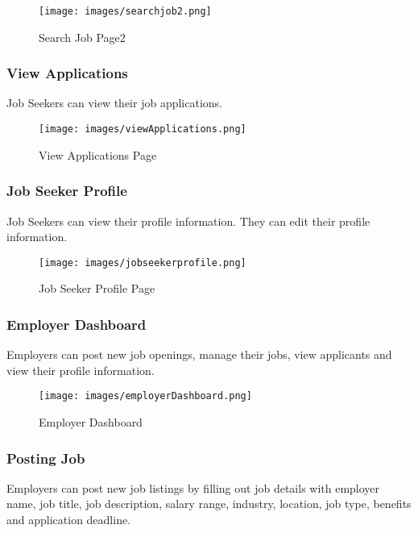 \documentclass[a4paper,12pt]{article}
\begin{document}
\begin{figure}[h!]
    \centering
    \texttt{[image: images/searchjob2.png]} 
    \caption{Search Job Page2}
    \label{fig:search_job2}
\end{figure}

\newpage

\subsubsection{View Applications}
Job Seekers can view their job applications.

\begin{figure}[h!]
    \centering
    \texttt{[image: images/viewApplications.png]} 
    \caption{View Applications Page}
    \label{fig:viewApplications}
\end{figure}


\subsubsection{Job Seeker Profile}
Job Seekers can view their profile information. They can edit their profile information.

\begin{figure}[h!]
    \centering
    \texttt{[image: images/jobseekerprofile.png]} 
    \caption{Job Seeker Profile Page}
    \label{fig:seeker_profile}
\end{figure}

\newpage

\subsubsection{Employer Dashboard}
Employers can post new job openings, manage their jobs, view applicants and view their profile information.

\begin{figure}[h!]
    \centering
    \texttt{[image: images/employerDashboard.png]} %
    \caption{Employer Dashboard}
    \label{fig:employer_dashboard}
\end{figure}

\subsubsection{Posting Job}
Employers can post new job listings by filling out job details with employer name, job title, job description, salary range, industry,  location, job type, benefits and application deadline.
\end{document}
